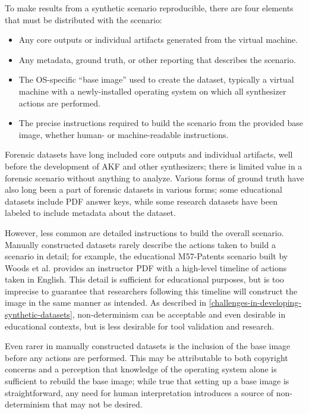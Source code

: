 \documentclass[letterpaper,12pt]{report}
\def\tightlist{}
\begin{document}
To make results from a synthetic scenario reproducible, there are four
elements that must be distributed with the scenario:

\begin{itemize}
\tightlist
\item
  Any core outputs or individual artifacts generated from the virtual
  machine.
\item
  Any metadata, ground truth, or other reporting that describes the
  scenario.
\item
  The OS-specific ``base image'' used to create the dataset, typically a
  virtual machine with a newly-installed operating system on which all
  synthesizer actions are performed.
\item
  The precise instructions required to build the scenario from the
  provided base image, whether human- or machine-readable instructions.
\end{itemize}

Forensic datasets have long included core outputs and individual
artifacts, well before the development of AKF and other synthesizers;
there is limited value in a forensic scenario without anything to
analyze. Various forms of ground truth have also long been a part of
forensic datasets in various forms; some educational datasets include
PDF answer keys, while some research datasets have been labeled to
include metadata about the dataset.

However, less common are detailed instructions to build the overall
scenario. Manually constructed datasets rarely describe the actions
taken to build a scenario in detail; for example, the educational
M57-Patents scenario built by Woods et al.
\cite{woodsCreatingRealisticCorpora2011} provides an instructor PDF
with a high-level timeline of actions taken in English. This detail is
sufficient for educational purposes, but is too imprecise to guarantee
that researchers following this timeline will construct the image in the
same manner as intended. As described in \autoref{challenges-in-developing-synthetic-datasets},
non-determinism can be acceptable and even desirable in educational
contexts, but is less desirable for tool validation and research.

Even rarer in manually constructed datasets is the inclusion of the base
image before any actions are performed. This may be attributable to both
copyright concerns and a perception that knowledge of the operating
system alone is sufficient to rebuild the base image; while true that
setting up a base image is straightforward, any need for human
interpretation introduces a source of non-determinism that may not be
desired.
\end{document}
